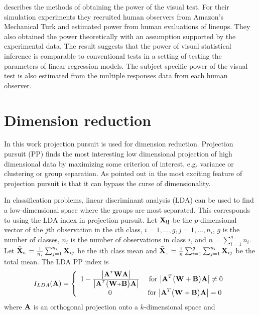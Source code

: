 \cite{majumder:2011} describes the methods of obtaining the power of the visual test. For their simulation experiments they recruited human observers from Amazon's Mechanical Turk \citep{turk} and estimated power from human evaluations of lineups. They also obtained the power theoretically with an assumption supported by the experimental data. The result suggests that the power of visual statistical inference is comparable to conventional tests in a setting of testing the parameters of linear regression models. The subject specific power of the visual test is also estimated from the multiple responses data from each human observer. 

 
\section{Dimension reduction}  \label{sec:dimred}

In this work projection pursuit \citep[e.g.][]{friedman:1974}  is used for dimension reduction. Projection pursuit (PP) finds the most interesting low dimensional projection of high dimensional data by maximizing some criterion of interest, e.g. variance or clustering or group separation. As pointed out in \cite{huber:1985} the most exciting feature of projection pursuit is that it can bypass the curse of dimensionality. 

In classification problems, linear discriminant analysis (LDA) can be used to find a low-dimensional space where the groups are most separated. This corresponds to using the LDA index \citep{lee:2009} in projection pursuit. Let $\bf{X_{ij}}$ be the $p$-dimensional vector of the $j$th observation in the $i$th class, $i = 1, \dots, g, j = 1, \dots, n_i$, $g$ is the number of classes, $n_i$ is the number of observations in class $i$, and $n = \sum_{i = 1}^g n_i$. Let $\bar{\mbox{\boldmath {\bf X}}}_{i.} = \frac{1}{n_i} \sum_{j=1}^{n_i} \mbox{\boldmath {\bf X}}_{ij}$
be the $i$th class mean and $\bar{\mbox{\boldmath {\bf X}}}_{..} =
\frac{1}{n}\sum_{i=1}^g \sum_{j=1}^{n_i} \mbox{\boldmath {\bf X}}_{ij}$ be the total
mean. The LDA PP index is
\begin{equation}
I_{LDA} ({\mbox{\boldmath {\bf A}}}) = \left \{ \begin{array}{cc}
                       1-\frac{\big|{\mbox{\boldmath {\bf A}}}^T\mbox{\boldmath {\bf W}}{\mbox{\boldmath {\bf A}}}\big|}{\big|{\mbox{\boldmath {\bf A}}}^T\big
                                  (\mbox{\boldmath {\bf W}} + \mbox{\boldmath {\bf B}}\big){\mbox{\boldmath {\bf A}}}\big|} &
                       \mbox{ for $\big|{\mbox{\boldmath {\bf A}}}^T\big(\mbox{\boldmath {\bf W}} + \mbox{\boldmath {\bf B}}\big) {\mbox{\boldmath {\bf A}}}\big| \ne 0$}\\
                       0 & \mbox{for  $\big|{\mbox{\boldmath {\bf A}}}^T\big(\mbox{\boldmath {\bf W}} + \mbox{\boldmath {\bf B}}\big) {\mbox{\boldmath {\bf A}}}\big| = 0$}
                       \end{array}
               \right.
\end{equation}
where $\mbox{\boldmath {\bf A}}$ is an orthogonal projection onto a $k$-dimensional space and

